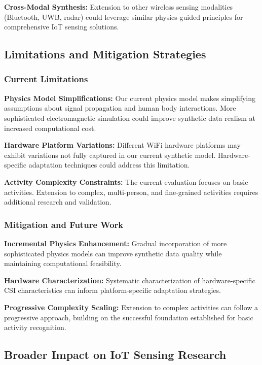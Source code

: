 \textbf{Cross-Modal Synthesis:} Extension to other wireless sensing modalities (Bluetooth, UWB, radar) could leverage similar physics-guided principles for comprehensive IoT sensing solutions.

\subsection{Limitations and Mitigation Strategies}

\subsubsection{Current Limitations}

\textbf{Physics Model Simplifications:} Our current physics model makes simplifying assumptions about signal propagation and human body interactions. More sophisticated electromagnetic simulation could improve synthetic data realism at increased computational cost.

\textbf{Hardware Platform Variations:} Different WiFi hardware platforms may exhibit variations not fully captured in our current synthetic model. Hardware-specific adaptation techniques could address this limitation.

\textbf{Activity Complexity Constraints:} The current evaluation focuses on basic activities. Extension to complex, multi-person, and fine-grained activities requires additional research and validation.

\subsubsection{Mitigation and Future Work}

\textbf{Incremental Physics Enhancement:} Gradual incorporation of more sophisticated physics models can improve synthetic data quality while maintaining computational feasibility.

\textbf{Hardware Characterization:} Systematic characterization of hardware-specific CSI characteristics can inform platform-specific adaptation strategies.

\textbf{Progressive Complexity Scaling:} Extension to complex activities can follow a progressive approach, building on the successful foundation established for basic activity recognition.

\subsection{Broader Impact on IoT Sensing Research}

